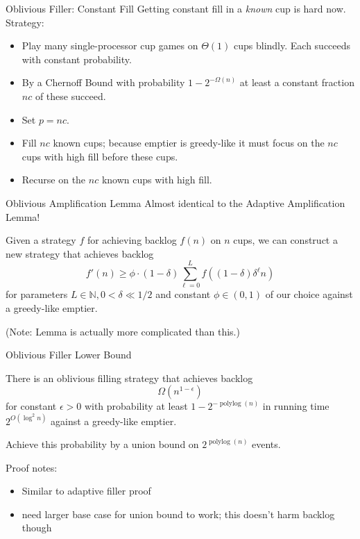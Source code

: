 \documentclass[xcolor=x11names, svgnames, rgb]{beamer}
\newcommand{\polylog}{\operatorname{polylog}}
\begin{document}
\begin{frame}[t]{Oblivious Filler: Constant Fill}
  Getting constant fill in a \emph{known} cup is hard now. Strategy:
  \begin{itemize}
    \item Play many single-processor cup games on $\Theta(1)$ cups
      blindly. Each succeeds with constant probability.
    \item By a Chernoff Bound with probability $1-2^{-\Omega(n)}$ at least a constant fraction $nc$ of these succeed.
    \item Set $p=nc$.
    \item Fill $nc$ known cups; because emptier is greedy-like it must focus on the $nc$ cups with high fill before these cups.
    \item Recurse on the $nc$ known cups with high fill.
  \end{itemize}
\end{frame}

\begin{frame}[t]{Oblivious Amplification Lemma}
Almost identical to the Adaptive Amplification Lemma!
  \begin{lemma}
    Given a strategy $f$ for achieving backlog $f(n)$ on $n$ cups, we can construct a new strategy that achieves backlog 
    $$f'(n) \ge \phi \cdot (1-\delta)\sum_{\ell=0}^L f((1-\delta)\delta^\ell n)$$
    for parameters $L\in\mathbb{N}, 0<\delta\ll 1/2$ and constant $\phi \in (0,1)$ of our choice against a greedy-like emptier.
  \end{lemma}

  (Note: Lemma is actually more complicated than this.)
\end{frame}

\begin{frame}[t]{Oblivious Filler Lower Bound }
  \begin{theorem}
    There is an oblivious filling strategy that achieves backlog
    $$\Omega(n^{1-\epsilon})$$ for constant $\epsilon > 0$ with probability at
    least $1-2^{-\polylog(n)}$ in running time $2^{O(\log^2 n)}$ against a greedy-like emptier.
  \end{theorem}

  Achieve this probability by a union bound on $2^{\polylog(n)}$ events.

  \vspace{0.5cm}
  Proof notes: 
  \begin{itemize}
    \item Similar to adaptive filler proof
    \item need larger base case for union bound to work; this doesn't harm backlog though
  \end{itemize}
\end{frame}
\end{document}
